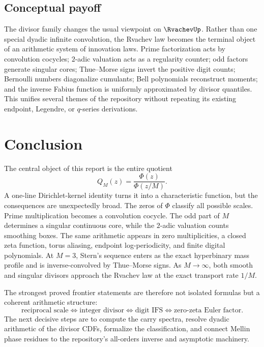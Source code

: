 \documentclass[11pt,oneside]{article}
\theoremstyle{definition}
\theoremstyle{remark}
\begin{document}
\subsection{Conceptual payoff}

The divisor family changes the usual viewpoint on $\RvachevUp$.  Rather than one special dyadic
infinite convolution, the Rvachev law becomes the terminal object of an arithmetic system of
innovation laws.  Prime factorization acts by convolution cocycles; $2$-adic valuation acts
as a regularity counter; odd factors generate singular cores; Thue--Morse signs invert the
positive digit counts; Bernoulli numbers diagonalize cumulants; Bell polynomials reconstruct
moments; and the inverse Fabius function is uniformly approximated by divisor quantiles.
This unifies several themes of the repository without repeating its existing endpoint,
Legendre, or $q$-series derivations.

\section{Conclusion}
\label{sec:conclusion}

The central object of this report is the entire quotient
\[
 Q_M(z)=\frac{\Phi(z)}{\Phi(z/M)}.
\]
A one-line Dirichlet-kernel identity turns it into a characteristic function, but the
consequences are unexpectedly broad.  The zeros of $\Phi$ classify all possible scales.
Prime multiplication becomes a convolution cocycle.  The odd part of $M$ determines a
singular continuous core, while the $2$-adic valuation counts smoothing boxes.  The same
arithmetic appears in zero multiplicities, a closed zeta function, torus aliasing, endpoint
log-periodicity, and finite digital polynomials.  At $M=3$, Stern's sequence enters as the
exact hyperbinary mass profile and is inverse-convolved by Thue--Morse signs.  As
$M\to\infty$, both smooth and singular divisors approach the Rvachev law at the exact
transport rate $1/M$.

The strongest proved frontier statements are therefore not isolated formulas but a
coherent arithmetic structure:
\[
 \boxed{
 \text{reciprocal scale}
 \Longleftrightarrow
 \text{integer divisor}
 \Longleftrightarrow
 \text{digit IFS}
 \Longleftrightarrow
 \text{zero-zeta Euler factor}.}
\]
The next decisive steps are to compute the carry spectra, resolve dyadic arithmetic of the
divisor CDFs, formalize the classification, and connect Mellin phase residues to the
repository's all-orders inverse and asymptotic machinery.
\end{document}
